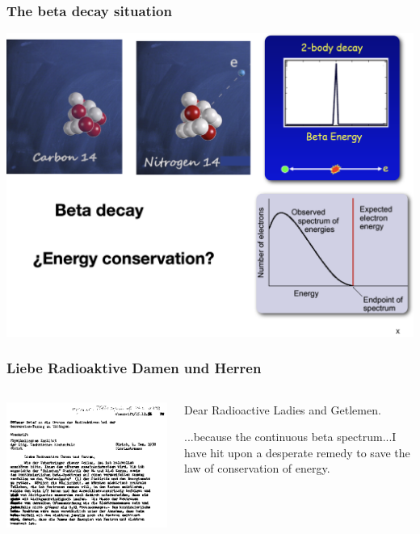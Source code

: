 
\begin{frame}
\frametitle{The beta decay situation}
\includegraphics[scale=0.3]{img/betaDecay.png}
\end{frame}

\begin{frame}
\frametitle{Liebe Radioaktive Damen und Herren}
\begin{columns}
 
\includegraphics[scale=0.4]{img/liebe.png}
 
\begin{block}{}
Dear Radioactive Ladies and Getlemen.

...because the continuous beta spectrum...I have hit upon a desperate remedy to save the law of conservation of energy.

\end{block}
\end{columns}
\end{frame}

